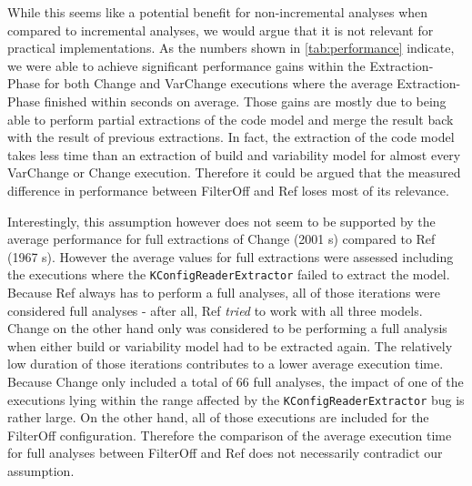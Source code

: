 \documentclass[a4paper]{article}
\begin{document}
While this seems like a potential benefit for non-incremental analyses when compared to incremental analyses, we would argue that it is not relevant for practical implementations. As the numbers shown in \autoref{tab:performance} indicate, we were able to achieve significant performance gains within the Extraction-Phase for both Change and VarChange executions where the average Extraction-Phase finished within seconds on average. Those gains are mostly due to being able to perform partial extractions of the code model and merge the result back with the result of previous extractions. In fact, the extraction of the code model takes less time than an extraction of build and variability model for almost every VarChange or Change execution. Therefore it could be argued that the measured difference in performance between FilterOff and Ref loses most of its relevance. 

Interestingly, this assumption however does not seem to be supported by the average performance for full extractions of Change (2001 s) compared to Ref (1967 s). However the average values for full extractions were assessed including the executions where the \texttt{KConfig\-Reader\-Extractor} failed to extract the model. Because Ref always has to perform a full analyses, all of those iterations were considered full analyses - after all, Ref \emph{tried} to work with all three models. Change on the other hand only was considered to be performing a full analysis when either build or variability model had to be extracted again. The relatively low duration of those iterations contributes to a lower average execution time. Because Change only included a total of 66 full analyses, the impact of one of the executions lying within the range affected by the \texttt{KConfig\-Reader\-Extractor} bug is rather large. On the other hand, all of those executions are included for the FilterOff configuration. Therefore the comparison of the average execution time for full analyses between FilterOff and Ref does not necessarily contradict our assumption. 
\end{document}
